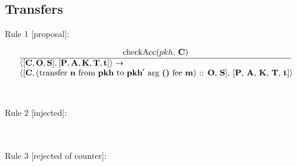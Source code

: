 \documentclass[a4paper]{llncs}
\begin{document}
\subsection{Transfers}

Rule 1 [proposal]:

\begin{equation}{}
  \frac{
    \text{checkAcc($pkh$, \ACCOUNTS)}
  }{
    \parbox{4.5in}{\text{$\langle[\ACCOUNTS, \OPERATIONS,
        \CONTRACTS], [\PENDING, \ACCEPTED, \MANAGERS, \CONTRACTORS,
        \TIME]\rangle \rightarrow$} \\
      \text{$\langle [\ACCOUNTS, (\TRANSFER\NTEZ\PKH{\PKH'}\MTEZ)$ ::
        \OPERATIONS, \CONTRACTS], [\PENDING, \ACCEPTED, \MANAGERS,
        \CONTRACTORS, \TIME]$\rangle$}}}  
\end{equation}
~\\
~\\
Rule 2 [injected]:

\begin{mathpar}
\end{mathpar}
~\\
~\\
Rule 3 [rejected of counter]:
\end{document}
